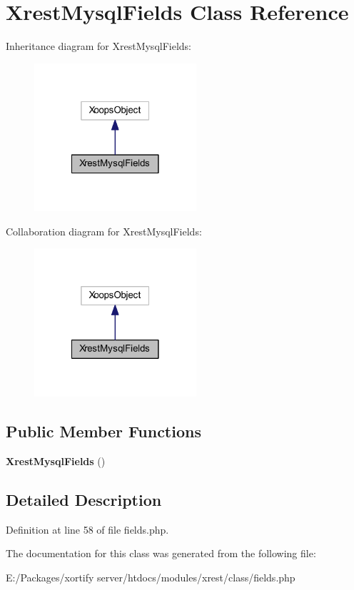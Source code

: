 \hypertarget{class_xrest_mysql_fields}{\section{Xrest\-Mysql\-Fields Class Reference}
\label{class_xrest_mysql_fields}
}


Inheritance diagram for Xrest\-Mysql\-Fields\-:
\nopagebreak
\begin{figure}[H]
\begin{center}
\leavevmode
\includegraphics[width=170pt]{class_xrest_mysql_fields__inherit__graph}
\end{center}
\end{figure}


Collaboration diagram for Xrest\-Mysql\-Fields\-:
\nopagebreak
\begin{figure}[H]
\begin{center}
\leavevmode
\includegraphics[width=170pt]{class_xrest_mysql_fields__coll__graph}
\end{center}
\end{figure}
\subsection*{Public Member Functions}
\begin{DoxyCompactItemize}
\item 
\hypertarget{class_xrest_mysql_fields_a204832ff89fe46bf10a2d0d5cc1dfbe7}{{\bfseries Xrest\-Mysql\-Fields} ()}\label{class_xrest_mysql_fields_a204832ff89fe46bf10a2d0d5cc1dfbe7}

\end{DoxyCompactItemize}


\subsection{Detailed Description}


Definition at line 58 of file fields.\-php.



The documentation for this class was generated from the following file\-:\begin{DoxyCompactItemize}
\item 
E\-:/\-Packages/xortify server/htdocs/modules/xrest/class/fields.\-php\end{DoxyCompactItemize}
